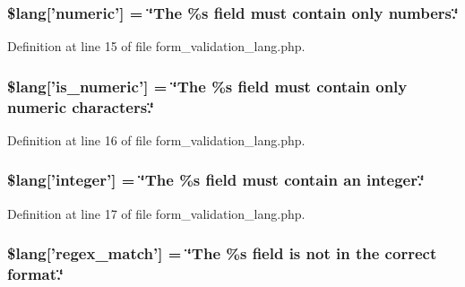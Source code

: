 \hypertarget{form__validation__lang_8php_a21d76ebd4b70690a642c86afb93e3cc2}{
\subsubsection[{\$lang}]{\setlength{\rightskip}{0pt plus 5cm}\$lang\mbox{[}'numeric'\mbox{]} = \char`\"{}The \%s field must contain only numbers.\char`\"{}}}\label{form__validation__lang_8php_a21d76ebd4b70690a642c86afb93e3cc2}


Definition at line 15 of file form\-\_\-validation\-\_\-lang.\-php.

\hypertarget{form__validation__lang_8php_a39b379d8a1148337906321c8d2ce03ec}{
\subsubsection[{\$lang}]{\setlength{\rightskip}{0pt plus 5cm}\$lang\mbox{[}'is\-\_\-numeric'\mbox{]} = \char`\"{}The \%s field must contain only numeric characters.\char`\"{}}}\label{form__validation__lang_8php_a39b379d8a1148337906321c8d2ce03ec}


Definition at line 16 of file form\-\_\-validation\-\_\-lang.\-php.

\hypertarget{form__validation__lang_8php_a23b8cd7ec18c6e0c1f85613a06100f7e}{
\subsubsection[{\$lang}]{\setlength{\rightskip}{0pt plus 5cm}\$lang\mbox{[}'integer'\mbox{]} = \char`\"{}The \%s field must contain an integer.\char`\"{}}}\label{form__validation__lang_8php_a23b8cd7ec18c6e0c1f85613a06100f7e}


Definition at line 17 of file form\-\_\-validation\-\_\-lang.\-php.

\hypertarget{form__validation__lang_8php_aa10761f3ecf310c4b347672c3d7cc483}{
\subsubsection[{\$lang}]{\setlength{\rightskip}{0pt plus 5cm}\$lang\mbox{[}'regex\-\_\-match'\mbox{]} = \char`\"{}The \%s field is {\bf not} in the correct format.\char`\"{}}}\label{form__validation__lang_8php_aa10761f3ecf310c4b347672c3d7cc483}



